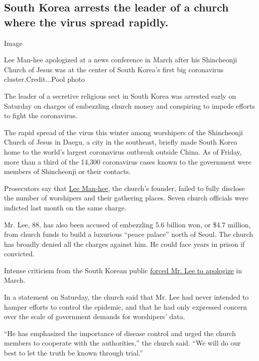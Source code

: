 \hypertarget{south-korea-arrests-the-leader-of-a-church-where-the-virus-spread-rapidly}{%
\subsection{South Korea arrests the leader of a church where the virus
spread
rapidly.}\label{south-korea-arrests-the-leader-of-a-church-where-the-virus-spread-rapidly}}

Image

Lee Man-hee apologized at a news conference in March after his
Shincheonji Church of Jesus was at the center of South Korea's first big
coronavirus cluster.Credit...Pool photo

The leader of a secretive religious sect in South Korea was arrested
early on Saturday on charges of embezzling church money and conspiring
to impede efforts to fight the coronavirus.

The rapid spread of the virus this winter among worshipers of the
Shincheonji Church of Jesus in Daegu, a city in the southeast, briefly
made South Korea home to the world's largest coronavirus outbreak
outside China. As of Friday, more than a third of the 14,300 coronavirus
cases known to the government were members of Shincheonji or their
contacts.

Prosecutors say that
\href{https://www.nytimes3xbfgragh.onion/2020/03/02/world/asia/coronavirus-south-korea-shincheonji.html?searchResultPosition=1}{Lee
Man-hee,} the church's founder, failed to fully disclose the number of
worshipers and their gathering places. Seven church officials were
indicted last month on the same charge.

Mr. Lee, 88, has also been accused of embezzling 5.6 billion won, or
\$4.7 million, from church funds to build a luxurious ``peace palace''
north of Seoul. The church has broadly denied all the charges against
him. He could face years in prison if convicted.

Intense criticism from the South Korean public
\href{https://www.nytimes3xbfgragh.onion/2020/03/02/world/asia/coronavirus-south-korea-shincheonji.html}{forced
Mr. Lee to apologize} in March.

In a statement on Saturday, the church said that Mr. Lee had never
intended to hamper efforts to control the epidemic, and that he had only
expressed concern over the scale of government demands for worshipers'
data.

``He has emphasized the importance of disease control and urged the
church members to cooperate with the authorities,'' the church said.
``We will do our best to let the truth be known through trial.''

